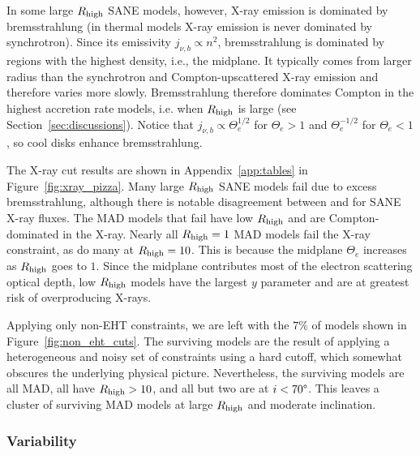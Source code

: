 In some large $R_\mathrm{high}$ SANE models, however, X-ray emission is dominated by bremsstrahlung (in thermal models X-ray emission is never dominated by synchrotron).
Since its emissivity $j_{\nu,b} \propto n^2$, bremsstrahlung is dominated by regions with the highest density, i.e., the midplane.
It typically comes from larger radius than the synchrotron and Compton-upscattered X-ray emission and therefore varies more slowly.
Bremsstrahlung therefore dominates Compton in the highest accretion rate models, i.e. when $R_\mathrm{high}$ is large (see Section~\ref{sec:discussions}).
Notice that $j_{\nu,b} \propto \Theta_e^{1/2}$ for $\Theta_e > 1$ and $\Theta_e^{-1/2}$ for $\Theta_e < 1$, so cool disks enhance bremsstrahlung.

The X-ray cut results are shown in Appendix~\ref{app:tables} in Figure~\ref{fig:xray_pizza}.  Many large $R_\mathrm{high}$ SANE models fail due to excess bremsstrahlung, although there is notable disagreement between \bhac and \kharma for SANE X-ray fluxes.
The MAD models that fail have low $R_\mathrm{high}$ and are Compton-dominated in the X-ray.
Nearly all $R_\mathrm{high} = 1$ MAD models fail the X-ray constraint, as do many at $R_\mathrm{high} = 10$.  This is because the midplane $\Theta_e$ increases as $R_\mathrm{high}$ goes to $1$.
Since the midplane contributes most of the electron scattering optical depth, low $R_\mathrm{high}$ models have the largest $y$ parameter and are at greatest risk of overproducing X-rays.


Applying only non-EHT constraints, we are left with the $7\%$ of models shown in Figure~\ref{fig:non_eht_cuts}.
The surviving models are the result of applying a heterogeneous and noisy set of constraints using a hard cutoff, which somewhat obscures the underlying physical picture.
Nevertheless, the surviving models are all MAD, all have $R_\mathrm{high} > 10$, and all but two are at $i < 70\degree$.
This leaves a cluster of surviving MAD models at large $R_\mathrm{high}$ and moderate inclination.

\subsubsection{Variability}

